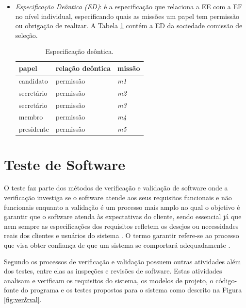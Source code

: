 \begin{itemize}
\item {\it Especificação Deôntica (ED)}: é a especificação que relaciona a EE com a EF no nível individual, especificando quais as missões um papel tem permissão ou obrigação de realizar. A Tabela \ref{tab:escola-deontica} contém a ED da sociedade comissão de seleção.

\begin{table}[ht]
\centering
\caption{Especificação deôntica. \cite{hubner2003modelo}}
\label{tab:escola-deontica}
\begin{tabular}{@{}lll@{}}
\toprule
papel       & relação deôntica  & missão                        \\ \midrule
candidato   & permissão         & \textit{m1}                          \\
secretário  & permissão         & \textit{m2}                          \\
secretário  & permissão         & \textit{m3}                          \\
membro      & permissão         & \textit{m4}                          \\
presidente  & permissão         & \textit{m5}                          \\
\bottomrule
\end{tabular}
\end{table}

\end{itemize}

\section{Teste de Software}

O teste faz parte dos métodos de verificação e validação de software onde a verificação investiga se o software atende aos seus requisitos funcionais e não funcionais enquanto a validação é um processo mais amplo no qual o objetivo é garantir que o software atenda às expectativas do cliente, sendo essencial já que nem sempre as especificações dos requisitos refletem os desejos ou necessidades reais dos clientes e usuários do sistema \cite{sommerville2010}. O termo garantir refere-se ao processo que visa obter confiança de que um sistema se comportará adequadamente \cite{winikoff2010assurance}. 

Segundo \citet{sommerville2010} os  processos de verificação e validação possuem outras atividades além dos testes, entre elas as inspeções e revisões de software. Estas atividades analisam e verificam os requisitos do sistema, os modelos de projeto, o código-fonte do programa e os testes propostos para o sistema como descrito na Figura \ref{fig:ver&val}. 

